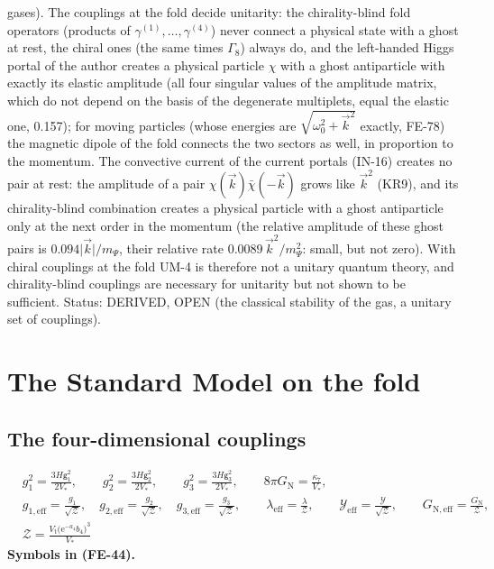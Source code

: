 \documentclass[
  10pt,
]{article}
\begin{document}
gases). The couplings at the fold decide unitarity: the chirality-blind
fold operators (products of \(\gamma^{(1)}, \dots, \gamma^{(4)}\)) never
connect a physical state with a ghost at rest, the chiral ones (the same
times \(\Gamma_8\)) always do, and the left-handed Higgs portal of the
author creates a physical particle \(\chi\) with a ghost antiparticle
with exactly its elastic amplitude (all four singular values of the
amplitude matrix, which do not depend on the basis of the degenerate
multiplets, equal the elastic one, 0.157); for moving particles (whose
energies are \(\sqrt{\omega_0^2 + \vec k^2}\) exactly, FE-78) the
magnetic dipole of the fold connects the two sectors as well, in
proportion to the momentum. The convective current of the current
portals (IN-16) creates no pair at rest: the amplitude of a pair
\(\chi(\vec k)\bar\chi(-\vec k)\) grows like \(\vec k^2\) (KR9), and its
chirality-blind combination creates a physical particle with a ghost
antiparticle only at the next order in the momentum (the relative
amplitude of these ghost pairs is \(0.094\lvert\vec k\rvert/m_\Psi\),
their relative rate \(0.0089\,\vec k^2/m_\Psi^2\): small, but not zero).
With chiral couplings at the fold UM-4 is therefore not a unitary
quantum theory, and chirality-blind couplings are necessary for
unitarity but not shown to be sufficient. Status: DERIVED, OPEN (the
classical stability of the gas, a unitary set of couplings).

\hypertarget{the-standard-model-on-the-fold}{%
\section{The Standard Model on the
fold}\label{the-standard-model-on-the-fold}}

\hypertarget{the-four-dimensional-couplings}{%
\subsection{The four-dimensional
couplings}\label{the-four-dimensional-couplings}}

\[
\begin{aligned}
&g_1^2 = \frac{3H\mathsf{g}_1^2}{2V_*},\qquad g_2^2 = \frac{3H\mathsf{g}_2^2}{2V_*},\qquad g_3^2 = \frac{3H\mathsf{g}_3^2}{2V_*},\qquad
 8\pi G_{\mathrm{N}} = \frac{\kappa_7}{V_*},\\
&g_{1,\mathrm{eff}} = \frac{g_1}{\sqrt{\mathcal{Z}}},\quad g_{2,\mathrm{eff}} = \frac{g_2}{\sqrt{\mathcal{Z}}},\quad g_{3,\mathrm{eff}} = \frac{g_3}{\sqrt{\mathcal{Z}}},\qquad \lambda_{\mathrm{eff}} = \frac{\lambda}{\mathcal{Z}},\qquad
 \mathcal{Y}_{\mathrm{eff}} = \frac{\mathcal{Y}}{\sqrt{\mathcal{Z}}},\qquad G_{\mathrm{N,eff}} = \frac{G_{\mathrm{N}}}{\mathcal{Z}},\\
&\mathcal{Z} = \frac{V_{\mathrm{t}}\big(\mathrm{e}^{-a_4}b_4\big)^3}{V_*}
\end{aligned} \tag{FE-44}
\] \textbf{Symbols in (FE-44).}
\end{document}
